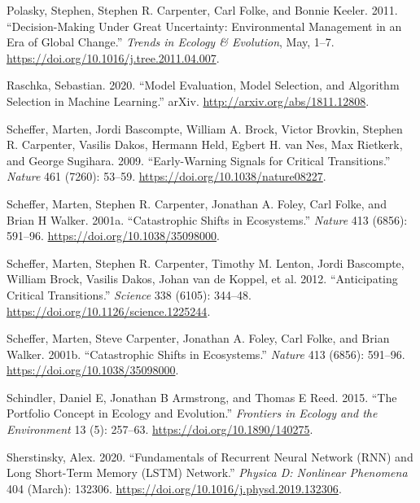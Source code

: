 \documentclass{article}
\newlength{\cslhangindent}
\newlength{\cslentryspacingunit} %
\newenvironment{CSLReferences}[2] %
 {%
  \setlength{\parindent}{0pt}
  \ifodd #1
  \let\oldpar\par
  \def\par{\hangindent=\cslhangindent\oldpar}
  \fi
  \setlength{\parskip}{#2\cslentryspacingunit}
 }%
 {}
\begin{document}
\begin{CSLReferences}{1}{0}
\leavevmode{}%
Polasky, Stephen, Stephen R. Carpenter, Carl Folke, and Bonnie Keeler.
2011. {``Decision-Making Under Great Uncertainty: Environmental
Management in an Era of Global Change.''} \emph{Trends in Ecology \&
Evolution}, May, 1--7. \url{https://doi.org/10.1016/j.tree.2011.04.007}.

\leavevmode{}%
Raschka, Sebastian. 2020. {``Model {Evaluation}, {Model} {Selection},
and {Algorithm} {Selection} in {Machine} {Learning}.''} arXiv.
\url{http://arxiv.org/abs/1811.12808}.

\leavevmode{}%
Scheffer, Marten, Jordi Bascompte, William A. Brock, Victor Brovkin,
Stephen R. Carpenter, Vasilis Dakos, Hermann Held, Egbert H. van Nes,
Max Rietkerk, and George Sugihara. 2009. {``Early-Warning Signals for
Critical Transitions.''} \emph{Nature} 461 (7260): 53--59.
\url{https://doi.org/10.1038/nature08227}.

\leavevmode{}%
Scheffer, Marten, Stephen R. Carpenter, Jonathan A. Foley, Carl Folke,
and Brian H Walker. 2001a. {``Catastrophic Shifts in Ecosystems.''}
\emph{Nature} 413 (6856): 591--96.
\url{https://doi.org/10.1038/35098000}.

\leavevmode{}%
Scheffer, Marten, Stephen R. Carpenter, Timothy M. Lenton, Jordi
Bascompte, William Brock, Vasilis Dakos, Johan van de Koppel, et al.
2012. {``Anticipating {Critical} {Transitions}.''} \emph{Science} 338
(6105): 344--48. \url{https://doi.org/10.1126/science.1225244}.

\leavevmode{}%
Scheffer, Marten, Steve Carpenter, Jonathan A. Foley, Carl Folke, and
Brian Walker. 2001b. {``Catastrophic Shifts in Ecosystems.''}
\emph{Nature} 413 (6856): 591--96.
\url{https://doi.org/10.1038/35098000}.

\leavevmode{}%
Schindler, Daniel E, Jonathan B Armstrong, and Thomas E Reed. 2015.
{``The Portfolio Concept in Ecology and Evolution.''} \emph{Frontiers in
Ecology and the Environment} 13 (5): 257--63.
\url{https://doi.org/10.1890/140275}.

\leavevmode{}%
Sherstinsky, Alex. 2020. {``Fundamentals of {Recurrent} {Neural}
{Network} ({RNN}) and {Long} {Short}-{Term} {Memory} ({LSTM})
{Network}.''} \emph{Physica D: Nonlinear Phenomena} 404 (March): 132306.
\url{https://doi.org/10.1016/j.physd.2019.132306}.


\end{CSLReferences}
\end{document}
